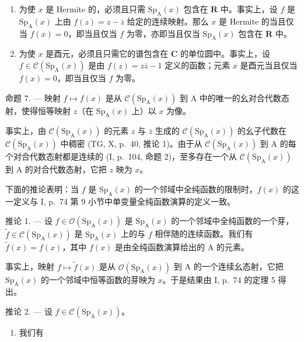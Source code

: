 \begin{enumerate}
\def\labelenumi{\arabic{enumi})}
\setcounter{enumi}{1}
\item
  为使 \(x\) 是 Hermite 的，必须且只需 \(\mathrm{Sp}_{\mathrm{A}}(x)\) 包含在 \(\mathbf{R}\) 中。事实上，设 \(f\) 是 \(\mathrm{Sp}_{\mathrm{A}}(x)\) 上由 \(f(z) = z - \overline{z}\) 给定的连续映射。那么 \(x\) 是 Hermite 的当且仅当 \(f(x) = 0\)，即当且仅当 \(f\) 为零，亦即当且仅当 \(\mathrm{Sp}_{\mathrm{A}}(x)\) 包含在 \(\mathbf{R}\) 中。
\item
  为使 \(x\) 是酉元，必须且只需它的谱包含在 \(\mathbf{C}\) 的单位圆中。事实上，设 \(f \in \mathcal{C}(\mathrm{Sp}_{\mathrm{A}}(x))\) 是由 \(f(z) = z\overline{z} - 1\) 定义的函数；元素 \(x\) 是酉元当且仅当 \(f(x) = 0\)，即当且仅当 \(f\) 为零。
\end{enumerate}

命题 7. — 映射 \(f \mapsto f(x)\) 是从 \(\mathcal{C}(\mathrm{Sp}_{\mathrm{A}}(x))\) 到 A 中的唯一的幺对合代数态射，使得恒等映射 \(z\)（在 \(\mathrm{Sp}_{\mathrm{A}}(x)\) 上）以 \(x\) 为像。

事实上，由 \(\mathcal{C}(\mathrm{Sp}_{\mathrm{A}}(x))\) 的元素 \(z\) 与 \(\overline{z}\) 生成的 \(\mathcal{C}(\mathrm{Sp}_{\mathrm{A}}(x))\) 的幺子代数在 \(\mathcal{C}(\mathrm{Sp}_{\mathrm{A}}(x))\) 中稠密 (TG, X, p.~40, 推论 1)。由于从 \(\mathcal{C}(\mathrm{Sp}_{\mathrm{A}}(x))\) 到 A 的每个对合代数态射都是连续的 (I, p.~104, 命题 2)，至多存在一个从 \(\mathcal{C}(\mathrm{Sp}_{\mathrm{A}}(x))\) 到 A 的对合代数态射，它把 \(z\) 映为 \(x\)。

下面的推论表明：当 \(f\) 是 \(\mathrm{Sp}_{\mathrm{A}}(x)\) 的一个邻域中全纯函数的限制时，\(f(x)\) 的这一定义与 I, p.~74 第 9 小节中单变量全纯函数演算的定义一致。

推论 1. --- 设 \(f \in \mathcal{O}(\mathrm{Sp}_{\mathrm{A}}(x))\) 是 \(\mathrm{Sp}_{\mathrm{A}}(x)\) 的一个邻域中全纯函数的一个芽，\(\widetilde{f} \in \mathcal{C}(\mathrm{Sp}_{\mathrm{A}}(x))\) 是 \(\mathrm{Sp}_{\mathrm{A}}(x)\) 上的与 \(f\) 相伴随的连续函数。我们有 \(\widetilde{f}(x) = f(x)\)，其中 \(f(x)\) 是由全纯函数演算给出的 A 的元素。

事实上，映射 \(f \mapsto \widetilde{f}(x)\) 是从 \(\mathcal{O}(\mathrm{Sp}_{\mathrm{A}}(x))\) 到 A 的一个连续幺态射，它把 \(\mathrm{Sp}_{\mathrm{A}}(x)\) 的一个邻域中恒等函数的芽映为 \(x\)。于是结果由 I, p.~74 的定理 5 得出。

推论 2. --- 设 \(f \in \mathcal{C}(\mathrm{Sp}_{\mathrm{A}}(x))\)。

\begin{enumerate}
\def\labelenumi{\alph{enumi})}
\tightlist
\item
  我们有
\end{enumerate}

